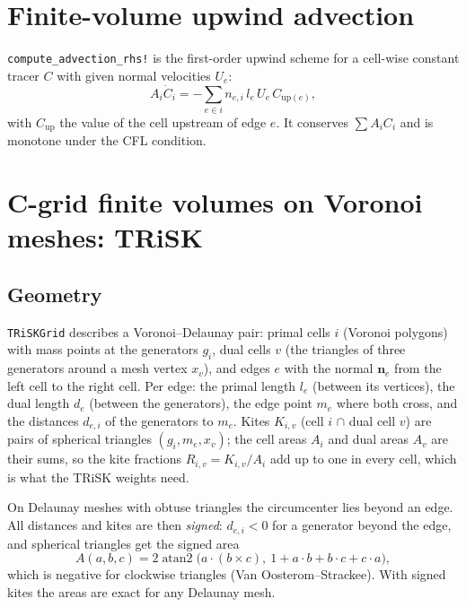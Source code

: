 \documentclass[11pt,a4paper]{article}
\newcommand{\bn}{\mathbf{n}}
\newcommand{\code}[1]{\texttt{#1}}
\begin{document}
\section{Finite-volume upwind advection}

\code{compute\_advection\_rhs!} is the first-order upwind scheme for a
cell-wise constant tracer $C$ with given normal velocities $U_e$:
\[
  A_i\dot C_i = -\sum_{e\in i} n_{e,i}\,l_e\,U_e\,C_{\mathrm{up}(e)},
\]
with $C_{\mathrm{up}}$ the value of the cell upstream of edge $e$. It conserves
$\sum A_iC_i$ and is monotone under the CFL condition.

\section{C-grid finite volumes on Voronoi meshes: TRiSK}
\label{sec:trisk}

\subsection{Geometry}

\code{TRiSKGrid} describes a Voronoi--Delaunay pair: primal cells $i$ (Voronoi
polygons) with mass points at the generators $g_i$, dual cells $v$ (the
triangles of three generators around a mesh vertex $x_v$), and edges $e$ with the
normal $\bn_e$ from the left cell to the right cell. Per edge: the primal length
$l_e$ (between its vertices), the dual length $d_e$ (between the generators),
the edge point $m_e$ where both cross, and the distances $d_{e,i}$ of the generators to $m_e$.
Kites $K_{i,v}$ (cell $i$ $\cap$ dual cell $v$) are pairs of spherical triangles
$(g_i, m_e, x_v)$; the cell areas $A_i$ and dual areas $A_v$ are their sums, so
the kite fractions $R_{i,v} = K_{i,v}/A_i$ add up to one in every cell, which is
what the TRiSK weights need.

On Delaunay meshes with obtuse triangles the circumcenter lies beyond an edge.
All distances and kites are then \emph{signed}: $d_{e,i}<0$ for a generator beyond
the edge, and spherical triangles get the signed area
\begin{equation}
  A(a,b,c) = 2\operatorname{atan2}\bigl(a\cdot(b\times c),\ 1 + a\cdot b + b\cdot c + c\cdot a\bigr),
\end{equation}
which is negative for clockwise triangles (Van Oosterom--Strackee). With signed
kites the areas are exact for any Delaunay mesh.
\end{document}

